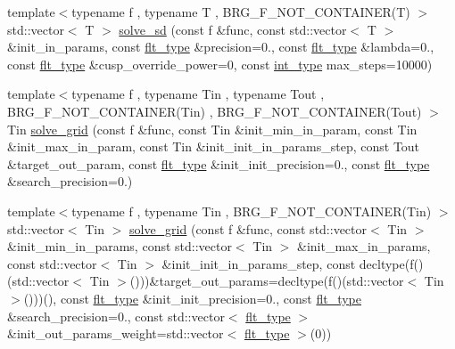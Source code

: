 \begin{DoxyCompactItemize}
\item 
{\footnotesize template$<$typename f , typename T , B\+R\+G\+\_\+\+F\+\_\+\+N\+O\+T\+\_\+\+C\+O\+N\+T\+A\+I\+N\+E\+R(\+T) $>$ }\\std\+::vector$<$ T $>$ \hyperlink{namespaceIceBRG_ae7b3a2eee0410a3273377df6ad8c6fa6}{solve\+\_\+sd} (const f \&func, const std\+::vector$<$ T $>$ \&init\+\_\+in\+\_\+params, const \hyperlink{lib_2IceBRG__main_2common_8h_ad0f130a56eeb944d9ef2692ee881ecc4}{flt\+\_\+type} \&precision=0., const \hyperlink{lib_2IceBRG__main_2common_8h_ad0f130a56eeb944d9ef2692ee881ecc4}{flt\+\_\+type} \&lambda=0., const \hyperlink{lib_2IceBRG__main_2common_8h_ad0f130a56eeb944d9ef2692ee881ecc4}{flt\+\_\+type} \&cusp\+\_\+override\+\_\+power=0, const \hyperlink{lib_2IceBRG__main_2common_8h_ac4de9d9335536ac22821171deec8d39e}{int\+\_\+type} max\+\_\+steps=10000)
\item 
{\footnotesize template$<$typename f , typename Tin , typename Tout , B\+R\+G\+\_\+\+F\+\_\+\+N\+O\+T\+\_\+\+C\+O\+N\+T\+A\+I\+N\+E\+R(\+Tin) , B\+R\+G\+\_\+\+F\+\_\+\+N\+O\+T\+\_\+\+C\+O\+N\+T\+A\+I\+N\+E\+R(\+Tout) $>$ }\\Tin \hyperlink{namespaceIceBRG_a2e57f2ccc8ea554486782ec73f24cec3}{solve\+\_\+grid} (const f \&func, const Tin \&init\+\_\+min\+\_\+in\+\_\+param, const Tin \&init\+\_\+max\+\_\+in\+\_\+param, const Tin \&init\+\_\+init\+\_\+in\+\_\+params\+\_\+step, const Tout \&target\+\_\+out\+\_\+param, const \hyperlink{lib_2IceBRG__main_2common_8h_ad0f130a56eeb944d9ef2692ee881ecc4}{flt\+\_\+type} \&init\+\_\+init\+\_\+precision=0., const \hyperlink{lib_2IceBRG__main_2common_8h_ad0f130a56eeb944d9ef2692ee881ecc4}{flt\+\_\+type} \&search\+\_\+precision=0.)
\item 
{\footnotesize template$<$typename f , typename Tin , B\+R\+G\+\_\+\+F\+\_\+\+N\+O\+T\+\_\+\+C\+O\+N\+T\+A\+I\+N\+E\+R(\+Tin) $>$ }\\std\+::vector$<$ Tin $>$ \hyperlink{namespaceIceBRG_ace50e9ed28a4b15e0cffb9322e8c0ff8}{solve\+\_\+grid} (const f \&func, const std\+::vector$<$ Tin $>$ \&init\+\_\+min\+\_\+in\+\_\+params, const std\+::vector$<$ Tin $>$ \&init\+\_\+max\+\_\+in\+\_\+params, const std\+::vector$<$ Tin $>$ \&init\+\_\+init\+\_\+in\+\_\+params\+\_\+step, const decltype(f()(std\+::vector$<$ Tin $>$()))\&target\+\_\+out\+\_\+params=decltype(f()(std\+::vector$<$ Tin $>$()))(), const \hyperlink{lib_2IceBRG__main_2common_8h_ad0f130a56eeb944d9ef2692ee881ecc4}{flt\+\_\+type} \&init\+\_\+init\+\_\+precision=0., const \hyperlink{lib_2IceBRG__main_2common_8h_ad0f130a56eeb944d9ef2692ee881ecc4}{flt\+\_\+type} \&search\+\_\+precision=0., const std\+::vector$<$ \hyperlink{lib_2IceBRG__main_2common_8h_ad0f130a56eeb944d9ef2692ee881ecc4}{flt\+\_\+type} $>$ \&init\+\_\+out\+\_\+params\+\_\+weight=std\+::vector$<$ \hyperlink{lib_2IceBRG__main_2common_8h_ad0f130a56eeb944d9ef2692ee881ecc4}{flt\+\_\+type} $>$(0))

\end{DoxyCompactItemize}

